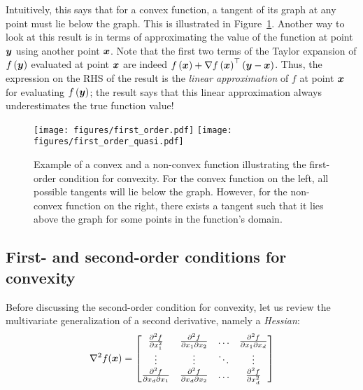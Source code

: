\documentclass{article}
\begin{document}
Intuitively, this says that for a convex function, a tangent of its graph at any point must lie below the graph. 
This is illustrated in Figure~\ref{fig:firstorder}.
Another way to look at this result is in terms of approximating the value of the function at point ${\bm{y}}$ using another point ${\bm{x}}$.
Note that the first two terms of the Taylor expansion of $f\left({\bm{y}}\right)$ evaluated at point ${\bm{x}}$ are indeed $f\left({\bm{x}}\right) + \nabla f\left({\bm{x}}\right)^\top\left({\bm{y}} -{\bm{x}}\right)$. 
Thus, the expression on the RHS of the result is the \emph{linear approximation} of $f$ at point ${\bm{x}}$ for evaluating $f\left({\bm{y}}\right)$; the result says that this linear approximation always underestimates the true function value!

\begin{figure}[ht]
\centering
    \texttt{[image: figures/first\_order.pdf]}
    \texttt{[image: figures/first\_order\_quasi.pdf]}
    \caption{Example of a convex and a non-convex function illustrating the first-order condition for convexity. For the convex function on the left, all possible tangents will lie below the graph. However, for the non-convex function on the right, there exists a tangent such that it lies above the graph for some points in the function's domain.}
    \label{fig:firstorder}
\end{figure}

\subsection{First- and second-order conditions for convexity}
\label{subsec:convexAnalysis:firstAndSecondOrderConditionsForConvexity}
Before discussing the second-order condition for convexity, let us review the multivariate generalization of a second derivative, namely a \emph{Hessian}:
\[
    \nabla^2 f({\bm{x}}) = \begin{bmatrix}
        \frac{\partial^2 f}{\partial {x}_1^2} & \frac{\partial^2 f}{\partial {x}_1 \partial {x}_2} & \ldots & \frac{\partial^2 f}{\partial {x}_1 \partial {x}_d}\\
        \vdots & \vdots & \ddots & \vdots\\
        \frac{\partial^2 f}{\partial {x}_d \partial {x}_1} & \frac{\partial^2 f}{\partial {x}_d \partial {x}_2} & \ldots & \frac{\partial^2 f}{\partial {x}_d^2}
    \end{bmatrix}
\]
\end{document}
